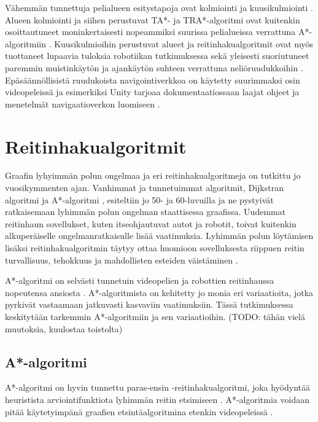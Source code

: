 \documentclass[utf8]{gradu3}
\begin{document}
Vähemmän tunnettuja pelialueen esitystapoja ovat kolmiointi ja kuusikulmiointi \parencite{abd2015comprehensive}. Alueen kolmiointi ja siihen perustuvat TA*- ja TRA*-algoritmi ovat kuitenkin osoittautuneet moninkertaisesti nopeammiksi suurissa pelialueissa verrattuna A*-algoritmiin \parencite{demyen2006efficient}. Kuusikulmioihin perustuvat alueet ja reitinhakualgoritmit ovat myös tuottaneet lupaavia tuloksia robotiikan tutkimuksessa sekä yleisesti suoriutuneet paremmin muistinkäytön ja ajankäytön suhteen verrattuna neliöruudukkoihin \parencite{abd2015comprehensive,lawande2022systematic}. Epäsäännöllisistä ruudukoista navigointiverkkoa on käytetty suurimmaksi osin videopeleissä ja esimerkiksi Unity tarjoaa dokumentaatiossaan laajat ohjeet ja menetelmät navigaatioverkon luomiseen \parencite{lawande2022systematic,unitydocnavmesh}.

\section{Reitinhakualgoritmit}

Graafin lyhyimmän polun ongelmaa ja eri reitinhakualgoritmeja on tutkittu jo vuosikymmenten ajan. Vanhimmat ja tunnetuimmat algoritmit, Dijkstran algoritmi \parencite{dijkstra1959note} ja A*-algoritmi \parencite{hart1968formal}, esiteltiin jo 50- ja 60-luvuilla ja ne pystyivät ratkaisemaan lyhimmän polun ongelman staattisessa graafissa. Uudemmat reitinhaun sovellukset, kuten itseohjautuvat autot ja robotit, toivat kuitenkin alkuperäiselle ongelmanratkaisulle lisää vaatimuksia. Lyhimmän polun löytämisen lisäksi reitinhakualgoritmin täytyy ottaa huomioon sovelluksesta riippuen reitin turvallisuus, tehokkuus ja mahdollisten esteiden väistäminen \parencite{karur2021survey}.

A*-algoritmi on selvästi tunnetuin videopelien ja robottien reitinhaussa nopeutensa ansiosta \parencite{cui2011based,abd2015comprehensive,botea2013pathfinding}. A*-algoritmista on kehitetty jo monia eri variaatioita, jotka pyrkivät vastaamaan jatkuvasti kasvaviin vaatimuksiin. Tässä tutkimuksessa keskitytään tarkemmin A*-algoritmiin ja sen variaatioihin. (TODO: tähän vielä muutoksia, kuulostaa toistolta)

\subsection{A*-algoritmi}

A*-algoritmi on hyvin tunnettu paras-ensin -reitinhakualgoritmi, joka hyödyntää heuristista arviointifunktiota lyhimmän reitin etsimiseen \parencite{cui2011based,duchovn2014path}. A*-algoritmia voidaan pitää käytetyimpänä graafien etsintäalgoritmina etenkin videopeleissä \parencite{botea2013pathfinding,lawande2022systematic}.
\end{document}
